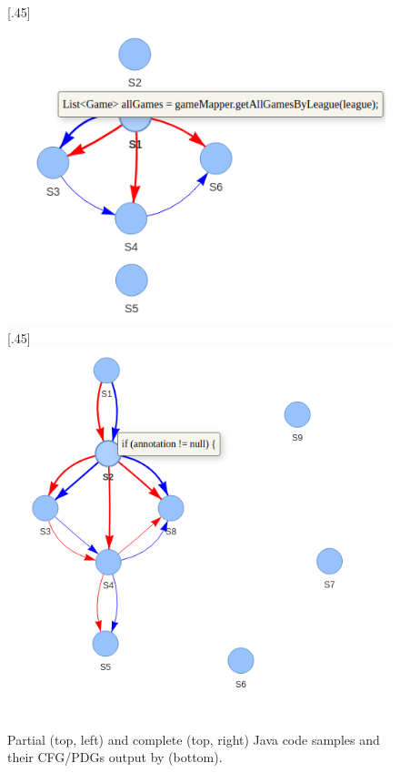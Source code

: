 \begin{figure}[ht]
\subcaptionbox{}[.45\textwidth]{
  \includegraphics[width=0.8\linewidth]{icse23-demo-figures/lst-partial.png}
  \vspace{2cm}
}
\subcaptionbox{}[.45\textwidth]{
  \includegraphics[width=\linewidth]{icse23-demo-figures/lst-complete.png}
}
\caption{Partial (top, left) and complete (top, right) Java code samples and their CFG/PDGs output by \tool (bottom).}
\label{fig:demo}
\end{figure}